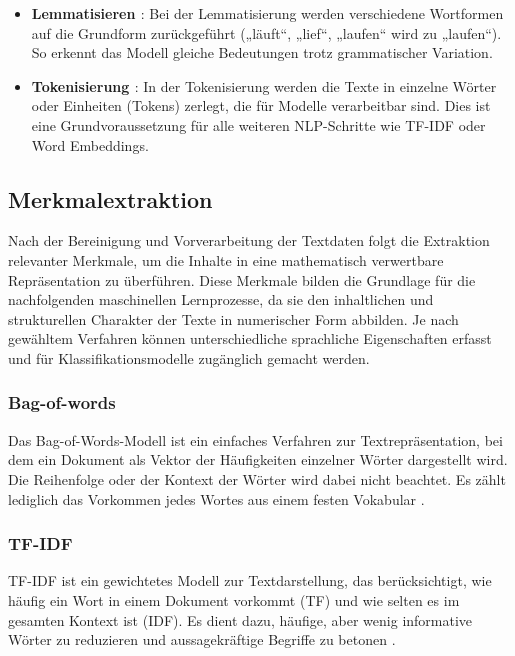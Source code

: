 \begin{itemize}
    \item \textbf{Lemmatisieren \cite{Buddhadev2025} \cite{sabir2025} \cite{aslam2022}}: Bei der Lemmatisierung werden verschiedene Wortformen auf die Grundform zurückgeführt 
    („läuft“, „lief“, „laufen“ wird zu „laufen“). So erkennt das Modell gleiche Bedeutungen trotz grammatischer Variation.
    \newpage
    \item \textbf{Tokenisierung \cite{sabir2025}}: In der Tokenisierung werden die Texte in einzelne Wörter oder Einheiten (Tokens) zerlegt, die für Modelle verarbeitbar sind. 
    Dies ist eine Grundvoraussetzung für alle weiteren NLP-Schritte wie TF-IDF oder Word Embeddings.
\end{itemize}


\subsection{Merkmalextraktion}
\label{sec:merkmalextraktion}

Nach der Bereinigung und Vorverarbeitung der Textdaten folgt die Extraktion relevanter Merkmale, um die Inhalte in eine mathematisch verwertbare 
Repräsentation zu überführen. 
Diese Merkmale bilden die Grundlage für die nachfolgenden maschinellen Lernprozesse, da sie den inhaltlichen und strukturellen Charakter der Texte 
in numerischer Form abbilden. 
Je nach gewähltem Verfahren können unterschiedliche sprachliche Eigenschaften erfasst 
und für Klassifikationsmodelle zugänglich gemacht werden.


\subsubsection{Bag-of-words}
\label{sec:bag_of_words}

Das Bag-of-Words-Modell ist ein einfaches Verfahren zur Textrepräsentation, bei dem ein Dokument als Vektor der Häufigkeiten 
einzelner Wörter dargestellt wird. Die Reihenfolge oder der Kontext der Wörter wird dabei nicht beachtet. Es zählt lediglich das Vorkommen jedes Wortes aus 
einem festen Vokabular \cite{cichosz2018forum}.

\subsubsection{TF-IDF}

TF-IDF ist ein gewichtetes Modell zur Textdarstellung, das berücksichtigt, wie häufig ein Wort in einem Dokument vorkommt (TF) 
und wie selten es im gesamten Kontext ist (IDF). Es dient dazu, häufige, aber wenig informative Wörter zu reduzieren und 
aussagekräftige Begriffe zu betonen \cite{elov2023uzbek}.

